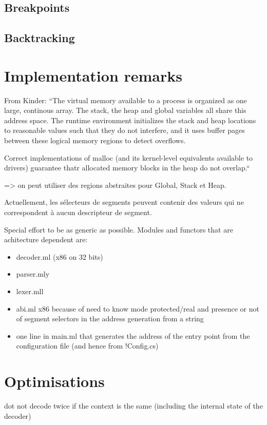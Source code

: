 \documentclass{report}
\begin{document}
\section{Breakpoints}
\section{Backtracking}

\chapter{Implementation remarks}

From Kinder:
``The virtual memory available to a process is organized as one large,
continous array. The stack, the heap and global variables all share
this address space. The runtime environment initializes the stack and
heap locations to reasonable values such that they do not interfere,
and it uses buffer pages between these logical memory regions to
detect overflows.

Correct implementations of malloc (and its kernel-level equivalents
available to drivers) guarantee thatr allocated memory blocks in the
heap do not overlap.``

=> on peut utiliser des regions abstraites pour Global, Stack et Heap.

Actuellement, les sélecteurs de segments peuvent contenir des valeurs
qui ne correspondent à aucun descripteur de segment.

Special effort to be as generic as possible.
Modules and functors that are achitecture dependent are:
\begin{itemize}
\item decoder.ml (x86 on 32 bits)
\item parser.mly
\item lexer.mll
\item abi.ml x86 because of need to know mode protected/real and
  presence or not of segment selectors in the address generation from
  a string
\item one line in main.ml that generates the address of the entry
  point from the configuration file (and hence from !Config.cs)
\end{itemize}


\chapter{Optimisations}
dot not decode twice if the context is the same (including the
internal state of the decoder)
\end{document}
